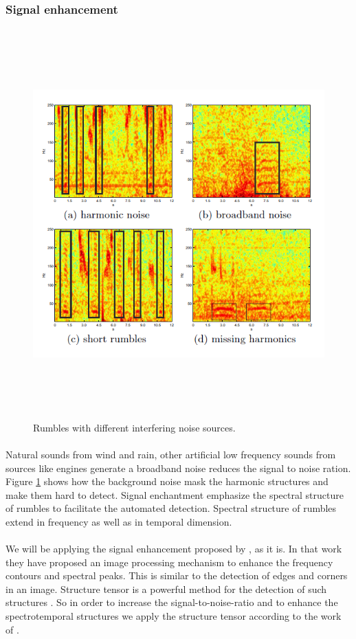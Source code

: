 \documentclass[12pt]{article}
\numberwithin{figure}{section}
\numberwithin{table}{section}
\begin{document}
\subsubsection{Signal enhancement}
\begin{figure}[H]
\centering
\includegraphics[width=12cm,height=15cm,keepaspectratio]{SNR.png}
\caption{Rumbles with different interfering noise
sources.}
\label{SNR}
\end{figure}
\paragraph{}
Natural sounds from wind and rain, other artificial low frequency sounds from sources like engines generate a broadband noise  reduces the signal to noise ration. Figure \ref{SNR} shows how the background noise mask the harmonic structures and make them hard to detect. Signal enchantment emphasize the spectral structure of rumbles to facilitate the automated detection. Spectral structure of rumbles extend in frequency as well as in temporal dimension. 

\paragraph{}
We will be applying the signal enhancement proposed by \cite{11}, as it is. In that work they have proposed an image processing mechanism to enhance the frequency contours and spectral peaks. This is similar to the detection of edges and corners in an image. Structure tensor is a powerful method for the detection of such structures \cite{38}. So in order to increase the signal-to-noise-ratio and to enhance the spectrotemporal structures  we apply the structure tensor according to the work of \cite{11}. 
\end{document}
